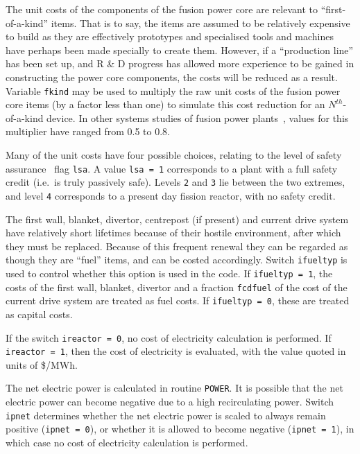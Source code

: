 \documentclass[11pt,a4paper]{report}
\begin{document}
The unit costs of the components of the fusion power core are relevant to ``first-of-a-kind'' items. That is to say, the items are assumed to be relatively expensive to build as they are effectively prototypes and specialised tools and machines have perhaps been made specially to create them. However, if a ``production line'' has been set up, and R \& D progress has allowed more experience to be gained in constructing the power core components, the costs will be reduced as a result. Variable \texttt{fkind} may be used to multiply the raw unit costs of the fusion power core items (by a
factor less than one) to simulate this cost reduction for an $N^{th}$-of-a-kind device. In other systems studies of fusion power plants~\cite{galambos}, values for this multiplier have ranged from 0.5 to 0.8.

Many of the unit costs have four possible choices, relating to the level of safety assurance~\cite{lsa} flag \texttt{lsa}. A value \texttt{lsa = 1} corresponds to a plant with a full safety credit (i.e.\ is truly passively safe). Levels \texttt{2} and \texttt{3} lie between the two extremes, and level \texttt{4} corresponds to a present day fission reactor, with no safety credit.

The first wall, blanket, divertor, centrepost (if present) and current drive system have relatively short lifetimes because of their hostile environment, after which they must be replaced. Because of this frequent renewal they can be regarded as though they are ``fuel'' items, and can be costed accordingly. Switch \texttt{ifueltyp} is used to control whether this option is used in the code. If \texttt{ifueltyp = 1}, the costs of the first wall, blanket, divertor and a fraction \texttt{fcdfuel} of the cost of the current drive system are treated as fuel costs. If \texttt{ifueltyp = 0}, these are treated as capital costs.

If the switch \texttt{ireactor = 0}, no cost of electricity calculation is performed. If \texttt{ireactor = 1}, then the cost of electricity is evaluated, with the value quoted in units of \$/MWh.

The net electric power is calculated in routine \texttt{POWER}. It is possible that the net electric power can become negative due to a high recirculating power. Switch \texttt{ipnet} determines whether the net electric power is scaled to always remain positive (\texttt{ipnet = 0}), or whether it is allowed to become negative (\texttt{ipnet = 1}), in which case no cost of electricity calculation is performed.
\end{document}
